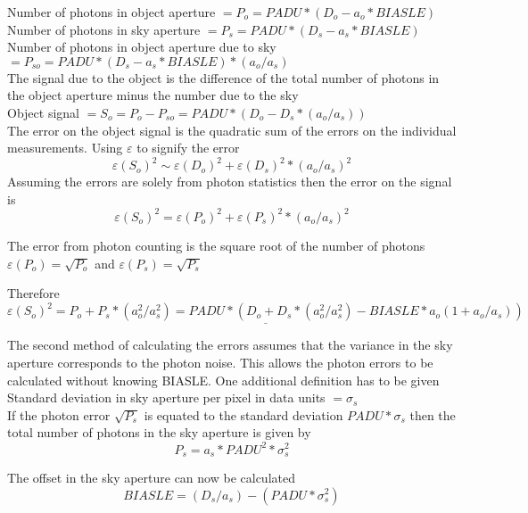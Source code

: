 Number of photons in object aperture $= P_o = PADU * ( D_o - a_o * BIASLE )$\\
Number of photons in sky aperture    $= P_s = PADU * ( D_s - a_s * BIASLE )$\\
Number of photons in object aperture due to sky
$= P_{so} = PADU * ( D_s - a_s * BIASLE ) * ( a_o / a_s )$\\

The signal due to the object is the difference of the total number of
photons in the object aperture minus the number due to the sky\\

Object signal $= S_o = P_o - P_{so} = PADU * ( D_o - D_s * ( a_o / a_s ) )$\\

The error on the object signal is the quadratic sum of the errors on the
individual measurements. Using $\varepsilon$ to signify the error
\[\varepsilon( S_o )^2 \sim \varepsilon( D_o )^2 + \varepsilon( D_s )^2 *
( a_o / a_s )^2\]
Assuming the errors are solely from photon statistics then the error on
the signal is
\[\varepsilon( S_o )^2 = \varepsilon( P_o )^2 + \varepsilon( P_s )^2 *
( a_o / a_s )^2\]

The error from photon counting is the square root of the number of photons
$\varepsilon( P_o ) = \sqrt{ P_o }$ and $\varepsilon( P_s ) = \sqrt{ P_s }$

Therefore
\begin{equation}\underline{
\varepsilon( S_o )^2 = P_o + P_s * ( a_o^2 / a_s^2 ) 
                      = PADU * ( D_o + D_s *( a_o^2 / a_s^2 ) -
                        BIASLE * a_o ( 1 + a_o / a_s ) )}\end{equation}

\newpage
The second method of calculating the errors assumes that the variance in
the sky aperture corresponds to the photon noise. This allows the photon
errors to be calculated without knowing BIASLE. One additional definition
has to be given\\

Standard deviation in sky aperture per pixel in data units $=\sigma_s$\\

If the photon error $\sqrt{P_s}$ is equated to the standard deviation
$PADU * \sigma_s$ then the total number of photons in the sky aperture is
given by
\[P_s = a_s * PADU^2 * \sigma_s^2\]

The offset in the sky aperture can now be calculated
\[BIASLE = ( D_s / a_s ) - ( PADU * \sigma_s^2 )\]

